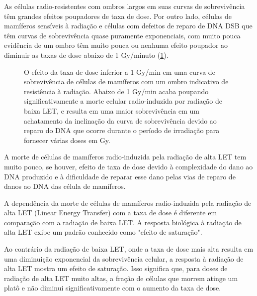 \documentclass[11pt,a4paper]{article}
\begin{document}
	As células radio-resistentes com ombros largos em suas curvas de sobrevivência têm grandes efeitos poupadores de taxa de dose. Por outro lado, células de mamíferos sensíveis à radiação e células com defeitos de reparo de DNA DSB que têm curvas de sobrevivência quase puramente exponenciais, com muito pouca evidência de um ombro têm muito pouca ou nenhuma efeito poupador ao diminuir as taxas de dose abaixo de 1 Gy/minuto (\ref{fig:efeitoTaxaDeDose}).

	\begin{figure}[h]
		\centering
		\caption{O efeito da taxa de dose inferior a 1 Gy/min em uma curva de sobrevivência de células de mamíferos com um ombro indicativo de resistência à radiação. Abaixo de 1 Gy/min acaba poupando significativamente a morte celular radio-induzida por radiação de baixa LET, e resulta em uma maior sobrevivência em um achatamento da inclinação da curva de sobrevivência devido ao reparo do DNA que ocorre durante o período de irradiação para fornecer várias doses em Gy.}
		\label{fig:efeitoTaxaDeDose}
	\end{figure}

	A morte de células de mamíferos radio-induzida pela radiação de alta LET tem muito pouco, se houver, efeito de taxa de dose devido à complexidade do dano ao DNA produzido e à dificuldade de reparar esse dano pelas vias de reparo de danos ao DNA das célula de mamíferos.

	A dependência da morte de células de mamíferos radio-induzida pela radiação de alta LET (Linear Energy Transfer) com a taxa de dose é diferente em comparação com a radiação de baixa LET. A resposta biológica à radiação de alta LET exibe um padrão conhecido como "efeito de saturação".

	Ao contrário da radiação de baixa LET, onde a taxa de dose mais alta resulta em uma diminuição exponencial da sobrevivência celular, a resposta à radiação de alta LET mostra um efeito de saturação. Isso significa que, para doses de radiação de alta LET muito altas, a fração de células que morrem atinge um platô e não diminui significativamente com o aumento da taxa de dose.
\end{document}

